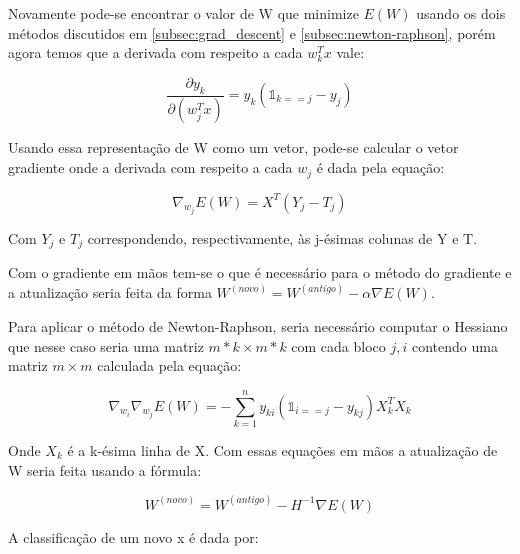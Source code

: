 Novamente pode-se encontrar o valor de W que minimize $E(W)$ usando os
dois métodos discutidos em \ref{subsec:grad_descent} e \ref{subsec:newton-raphson},
porém agora temos que a derivada com respeito a cada $w_k^Tx$ vale:

\begin{center}
	\begin{equation}\label{eq:softmax_derivative}
		\frac{\partial y_k}{\partial (w_j^Tx)} = y_k(\mathds{1}_{k == j} - y_j)
	\end{equation}
\end{center}

Usando essa representação de W como um vetor, pode-se calcular o vetor gradiente onde a derivada
com respeito a cada $w_j$ é dada pela equação:

\begin{center}
	\begin{equation}
		\nabla_{w_j} E(W) = X^T(Y_j - T_j)
	\end{equation}
\end{center}

Com $Y_j$ e $T_j$ correspondendo, respectivamente, às j-ésimas colunas de Y e T.

Com o gradiente em mãos tem-se o que é necessário para o método do gradiente e a
atualização seria feita da forma $W^{ (novo) } = W^{ (antigo) } - \alpha \nabla E(W)$.

Para aplicar o método de Newton-Raphson, seria necessário computar o Hessiano que
nesse caso seria uma matriz $m*k \times m*k$ com cada bloco $j, i$ contendo uma matriz
$m \times m$ calculada pela equação:

\begin{center}
	\begin{equation}
		\nabla_{w_i} \nabla_{w_j} E(W) = - \sum_{k = 1}^n y_{ki}( \mathds{1}_{i == j} - y_{kj})
		X_k^TX_k
	\end{equation}
\end{center} 

Onde $X_k$ é a k-ésima linha de X. Com essas equações em mãos a atualização de
W seria feita usando a fórmula:

\begin{center}
	\begin{equation}
		 W^{ (novo) } = W^{ (antigo) } - H^{-1}\nabla E(W)	
	\end{equation}
\end{center}

A classificação de um novo x é dada por: 

